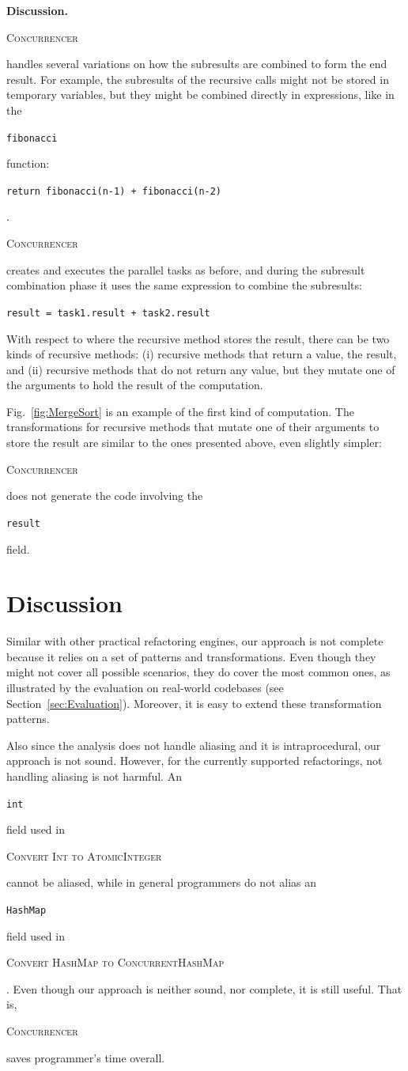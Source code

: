 \documentclass[10pt,twocolumn]{article}
\newcommand{\tool}{\begin{scriptsize}\textsc{Concurrencer}\end{scriptsize}\xspace}
\newcommand{\code}[1]{\begin{smaller}\texttt{#1}\end{smaller}}
\newcommand{\myParagraph}[1]{\textbf{#1}}
\newcommand{\ConvertToAtomicInteger}{{\begin{smaller}\begin{smaller}\textsc{Convert Int to AtomicInteger}\end{smaller}\end{smaller}}\xspace}
\newcommand{\ConvertToConcurrentHashMap}{{\begin{smaller}\begin{smaller}\textsc{Convert HashMap to ConcurrentHashMap}\end{smaller}\end{smaller}}\xspace}
\begin{document}
\myParagraph{Discussion.}
\tool handles several variations on how the subresults are combined to form the
end result. For example, the subresults of the recursive calls might not
be stored in temporary variables, but they might be combined directly in
expressions, like in the \code{fibonacci} function: \\ 
\code{return fibonacci(n-1) + fibonacci(n-2)}. 

\tool creates and executes the parallel tasks as before, and during the
subresult combination phase it uses the same expression to combine the 
subresults:\\
\code{result = task1.result + task2.result}
 
With respect to where the recursive method stores the result, there can be two
kinds of recursive methods: (i) recursive methods that return a value, the
result, and (ii) recursive methods that do not return any value, but they
mutate one of the arguments to hold the result of the computation.

Fig.~\ref{fig:MergeSort} is an example of the first kind of computation. 
The transformations for recursive methods that mutate one of their arguments
to store the result are similar to the ones presented above, even slightly
simpler: \tool does not generate the code involving the \code{result}
field.

\section{Discussion}
Similar with other practical refactoring engines, our approach is not complete
because it relies on a set of patterns and transformations. Even though they
might not cover all possible scenarios, they do cover the most common ones, as
illustrated by the evaluation on real-world codebases (see
Section~\ref{sec:Evaluation}). Moreover, it is easy to extend these
transformation patterns.

Also since the analysis does not handle aliasing and it is intraprocedural,
our approach is not sound. However, for the currently supported refactorings,
not handling aliasing is not harmful. An \code{int} field used in
\ConvertToAtomicInteger cannot be aliased, while in general programmers do not
alias an \code{HashMap} field used in \ConvertToConcurrentHashMap.
Even though our approach is neither sound, nor complete, it is still useful.
That is, \tool saves programmer's time overall.
\end{document}
